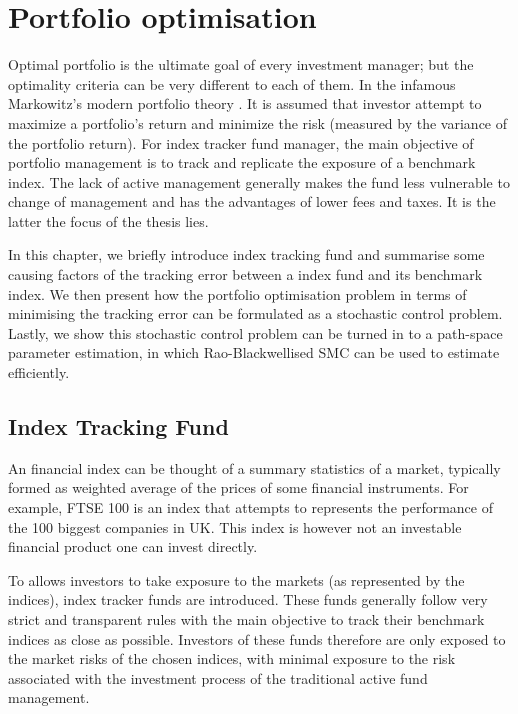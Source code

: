 \chapter{Portfolio optimisation}
\graphicspath{{Chapter4/figures/}}
\label{lab:PO}
Optimal portfolio is the ultimate goal of every investment manager; but the optimality criteria can be very different to each of them. In the infamous Markowitz's modern portfolio theory \cite{HM52}. It is assumed that investor attempt to maximize a portfolio's return and minimize the risk (measured by the variance of the portfolio return). For index tracker fund manager, the main objective of portfolio management is to track and replicate the exposure of a benchmark index. The lack of active management generally makes the fund less vulnerable to change of management and has the advantages of lower fees and taxes. It is the latter the focus of the thesis lies.
 
In this chapter, we briefly introduce index tracking fund and summarise some causing factors of the tracking error between a index fund and its benchmark index. We then present how the portfolio optimisation problem in terms of minimising the tracking error can be formulated as a stochastic control problem. Lastly, we show this stochastic control problem can be turned in to a path-space parameter estimation, in which Rao-Blackwellised SMC can be used to estimate efficiently.
 
\section{Index Tracking Fund}
An financial index can be thought of a summary statistics of a market, typically formed as weighted average of the prices of some financial instruments. For example, FTSE 100 is an index that attempts to represents the performance of the 100 biggest companies in UK. This index is however not an investable financial product one can invest directly.
 
To allows investors to take exposure to the markets (as represented by the indices), index tracker funds are introduced. These funds generally follow very strict and transparent rules with the main objective to track their benchmark indices as close as possible. Investors of these funds therefore are only exposed to the market risks of the chosen indices, with minimal exposure to the risk associated with the investment process of the traditional active fund management.
 
